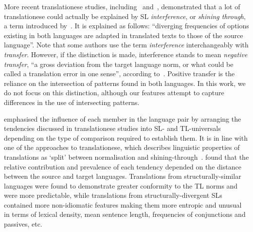 More recent translationese studies, including~\citet{Koppel2011,Volansky2015,Rabinovich2017,Chowdhury2020,Chowdhury2021,Kunilovskaya2020vars} and~\citet{Evert2017}, demonstrated that a lot of translationese could actually be explained by SL \textit{interference}, or \textit{shining through}, a term introduced by~\citet{Teich2003}. It is explained as follows: ``diverging frequencies of options existing in both languages are adapted in translated texts to those of the source language''. %
Note that some authors use the term \textit{interference} interchangeably with \textit{transfer}. However, if the distinction is made, interference stands to mean \textit{negative transfer}, ``a gross deviation from the target language norm, or what could be called a translation error in one sense'', according to~\citet[p.71--72]{Mauranen2004}. Positive transfer is the reliance on the intersection of patterns found in both languages. In this work, we do not focus on this distinction, although our features attempt to capture differences in the use of intersecting patterns.

\citet{Chesterman2004} emphasised the influence of each member in the language pair by arranging the tendencies discussed in translationese studies into SL- and TL-universals depending on the type of comparison required to establish them. It is in line with one of the approaches to translationese, which describes linguistic properties of translations as `split' between normalisation and shining-through~\cite[see, for example, ][]{HansenSchirra2011}. \citet{Nikolaev2020} found that the relative contribution and prevalence of each tendency depended on the distance between the source and target languages. Translations from structurally-similar languages were found to demonstrate greater conformity to the TL norms and were more predictable, while translations from structurally-divergent SLs contained more non-idiomatic features making them more entropic and unusual in terms of lexical density, mean sentence length, frequencies of conjunctions and passives, etc. 

